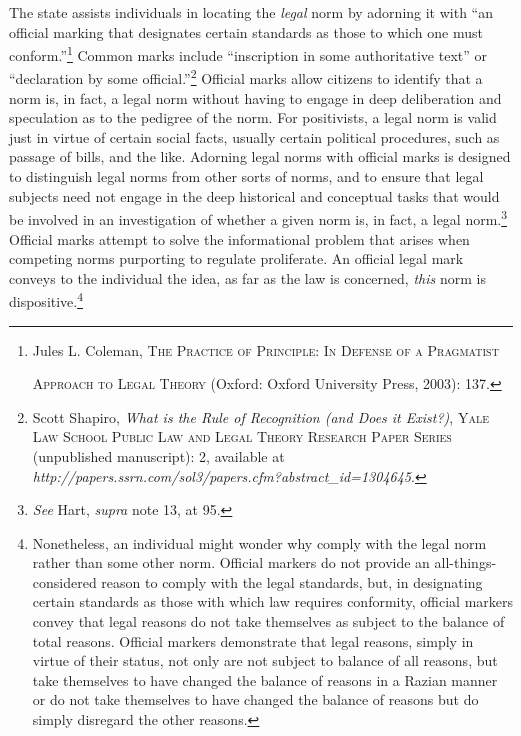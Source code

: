 The state assists individuals in locating the \emph{legal} norm by
adorning it with ``an official marking that designates certain standards
as those to which one must conform.''\footnote{Jules L. Coleman,
  \textsc{The Practice of Principle: In Defense of a Pragmatist}

  \textsc{Approach to Legal Theory} (Oxford: Oxford University Press,
  2003): 137.} Common marks include ``inscription in some authoritative
text'' or ``declaration by some official.''\footnote{Scott Shapiro,
  \emph{What is the Rule of Recognition (and Does it Exist?)},
  \textsc{Yale Law School Public Law and Legal Theory Research Paper
  Series} (unpublished manuscript): 2, available at
  \emph{http://papers.ssrn.com/sol3/papers.cfm?abstract\_id=1304645}.}
Official marks allow citizens to identify that a norm is, in fact, a
legal norm without having to engage in deep deliberation and speculation
as to the pedigree of the norm. For positivists, a legal norm is valid
just in virtue of certain social facts, usually certain political
procedures, such as passage of bills, and the like. Adorning legal norms
with official marks is designed to distinguish legal norms from other
sorts of norms, and to ensure that legal subjects need not engage in the
deep historical and conceptual tasks that would be involved in an
investigation of whether a given norm is, in fact, a legal
norm.\footnote{\emph{See} Hart, \emph{supra} note 13, at 95.} Official
marks attempt to solve the informational problem that arises when
competing norms purporting to regulate proliferate. An official legal
mark conveys to the individual the idea, as far as the law is concerned,
\emph{this} norm is dispositive.\footnote{Nonetheless, an individual
  might wonder why comply with the legal norm rather than some other
  norm. Official markers do not provide an all-things-considered reason
  to comply with the legal standards, but, in designating certain
  standards as those with which law requires conformity, official
  markers convey that legal reasons do not take themselves as subject to
  the balance of total reasons. Official markers demonstrate that legal
  reasons, simply in virtue of their status, not only are not subject to
  balance of all reasons, but take themselves to have changed the
  balance of reasons in a Razian manner or do not take themselves to
  have changed the balance of reasons but do simply disregard the other
  reasons.}

